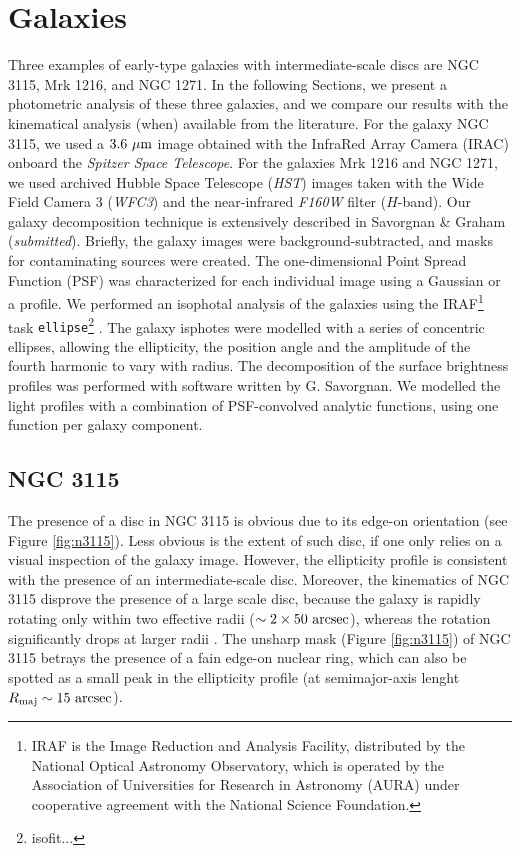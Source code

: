 \documentclass[useAMS,usenatbib,article]{mn2e}
\begin{document}
\section{Galaxies}
\label{sec:gal}
Three examples of early-type galaxies with intermediate-scale discs are NGC 3115, Mrk 1216, and NGC 1271. 
In the following Sections, we present a photometric analysis of these three galaxies, 
and we compare our results with the kinematical analysis (when) available from the literature. 
For the galaxy NGC 3115, we used a $3.6~\rm \mu m$ image obtained with the InfraRed Array Camera (IRAC) 
onboard the \emph{Spitzer Space Telescope}. 
For the galaxies Mrk 1216 and NGC 1271, we used archived Hubble Space Telescope (\emph{HST}) images 
taken with the Wide Field Camera 3 (\emph{WFC3}) and the near-infrared \emph{F160W} filter ($H$-band). 
Our galaxy decomposition technique is extensively described in Savorgnan \& Graham (\emph{submitted}).
Briefly, the galaxy images were background-subtracted, and masks for contaminating sources were created. 
The one-dimensional Point Spread Function (PSF) was characterized for each individual image 
using a Gaussian or a \cite{moffat1969} profile.
We performed an isophotal analysis of the galaxies using the IRAF\footnote{IRAF 
is the Image Reduction and Analysis Facility, distributed by the National Optical Astronomy Observatory, 
which is operated
by the Association of Universities for Research in Astronomy (AURA) 
under cooperative agreement with the National Science Foundation.} task {\tt ellipse}\footnote{isofit...} \citep{taskellipse}. 
The galaxy isphotes were modelled with a series of concentric ellipses, 
allowing the ellipticity, the position angle and the amplitude of the fourth harmonic to vary with radius.  
The decomposition of the surface brightness profiles was performed with software written by G. Savorgnan.
We modelled the light profiles with a combination of PSF-convolved analytic functions, 
using one function per galaxy component. 


\subsection{NGC 3115}
The presence of a disc in NGC 3115 is obvious due to its edge-on orientation (see Figure \ref{fig:n3115}). 
Less obvious is the extent of such disc, if one only relies on a visual inspection of the galaxy image. 
However, the ellipticity profile is consistent with the presence of an intermediate-scale disc. 
Moreover, the kinematics of NGC 3115 disprove the presence of a large scale disc, 
because the galaxy is rapidly rotating only within two effective radii ($\sim 2 \times 50~\rm arcsec$), 
whereas the rotation significantly drops at larger radii \citep{arnold2011n3115}.  
The unsharp mask (Figure \ref{fig:n3115}) of NGC 3115 betrays the presence of a fain edge-on nuclear ring, 
which can also be spotted as a small peak in the ellipticity profile 
(at semimajor-axis lenght $R_{\rm maj} \sim 15~\rm arcsec$).
\end{document}
